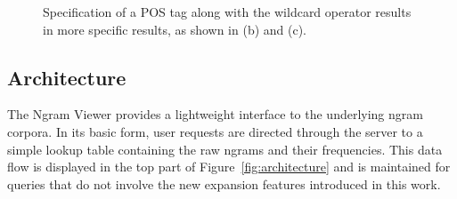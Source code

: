 \documentclass[11pt,a4paper]{article}
\begin{document}
\begin{figure}[!t]
\vspace{-0.1in}
\centering
\addtolength{\subfigcapskip}{-0.2cm}
\hspace*{-0.5cm}
\caption{\label{fig:presidents}
Specification of a POS tag along with the wildcard operator results in more
specific results, as shown in (b) and (c).}
\vspace{-0.1in}
\end{figure}


\subsection{Architecture}
The Ngram Viewer provides a lightweight interface to the underlying ngram corpora. In its basic form, user requests are directed through the server to a simple lookup table containing the raw ngrams and their frequencies. This data flow is displayed in the top part of Figure~\ref{fig:architecture} and is maintained for queries that do not involve the new expansion features introduced in this work.
\end{document}
